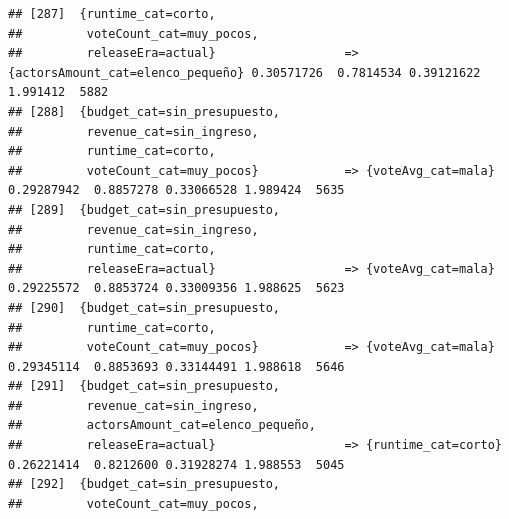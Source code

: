 \documentclass[
]{article}
\begin{document}
\begin{verbatim}
## [287]  {runtime_cat=corto,                                                                                                      
##         voteCount_cat=muy_pocos,                                                                                                
##         releaseEra=actual}                  => {actorsAmount_cat=elenco_pequeño} 0.30571726  0.7814534 0.39121622 1.991412  5882
## [288]  {budget_cat=sin_presupuesto,                                                                                             
##         revenue_cat=sin_ingreso,                                                                                                
##         runtime_cat=corto,                                                                                                      
##         voteCount_cat=muy_pocos}            => {voteAvg_cat=mala}                0.29287942  0.8857278 0.33066528 1.989424  5635
## [289]  {budget_cat=sin_presupuesto,                                                                                             
##         revenue_cat=sin_ingreso,                                                                                                
##         runtime_cat=corto,                                                                                                      
##         releaseEra=actual}                  => {voteAvg_cat=mala}                0.29225572  0.8853724 0.33009356 1.988625  5623
## [290]  {budget_cat=sin_presupuesto,                                                                                             
##         runtime_cat=corto,                                                                                                      
##         voteCount_cat=muy_pocos}            => {voteAvg_cat=mala}                0.29345114  0.8853693 0.33144491 1.988618  5646
## [291]  {budget_cat=sin_presupuesto,                                                                                             
##         revenue_cat=sin_ingreso,                                                                                                
##         actorsAmount_cat=elenco_pequeño,                                                                                        
##         releaseEra=actual}                  => {runtime_cat=corto}               0.26221414  0.8212600 0.31928274 1.988553  5045
## [292]  {budget_cat=sin_presupuesto,                                                                                             
##         voteCount_cat=muy_pocos,                                                                                                

\end{verbatim}
\end{document}
